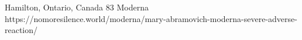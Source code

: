           {Hamilton, Ontario, Canada}
          {83}
          {Moderna}
          {}
          {
          }
          {https://nomoresilence.world/moderna/mary-abramovich-moderna-severe-adverse-reaction/}
          
